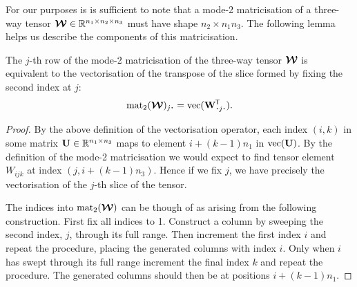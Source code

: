 For our purposes is is sufficient to note that a 
mode-2 matricisation of a
three-way tensor \(\bm{\mathcal{W}} \in \mathbb{R}^{n_1\times n_2\times n_3}\) must have shape
\(n_2 \times n_1n_3\). The following lemma helps us describe the components of this matricisation.

\begin{lem}
The \(j\)-th row of the mode-2 matricisation of the three-way tensor \(\bm{\mathcal{W}}\)
is equivalent to the vectorisation of the transpose of the slice formed by fixing the second index 
at \(j\):
\begin{equation}\label{eq:matlemstatement}
	\matr_2 (\tensor{W})_{j \midbullet} = \vect(\tran{\mat{W}_{\midbullet j \midbullet}}).
\end{equation}
\label{lem:matricise}
\end{lem}
\begin{proof}
By the above definition of the vectorisation operator, each index \((i, k)\) in some matrix
\(\mathbf{U} \in \mathbb{R}^{n_1\times n_3}\) maps to element \(i + (k-1)n_1\) in
\(\operatorname{vec}(\mathbf{U})\). By the definition of the mode-2 matricisation we would expect to
find tensor element \(W_{ijk}\) at index \((j, i + (k-1)n_3)\). Hence if we fix \(j\), we have
precisely the vectorisation of the \(j\)-th slice of the tensor.

The indices into \(\operatorname{mat}_2(\bm{\mathcal{W}})\) can be though of as arising from the following construction.
First fix all indices to 1. Construct a column by sweeping the second index, \(j\),
through its full range. Then increment the first index \(i\) and repeat the procedure, placing
the generated columns with index \(i\). Only when \(i\) has swept through its full range
increment the final index \(k\) and repeat the procedure. The generated columns should then be
at positions \(i + (k-1)n_1\).
\end{proof}


